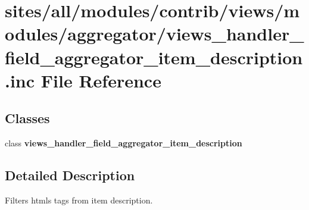 \hypertarget{views__handler__field__aggregator__item__description_8inc}{
\section{sites/all/modules/contrib/views/modules/aggregator/views\_\-handler\_\-field\_\-aggregator\_\-item\_\-description.inc File Reference}
\label{views__handler__field__aggregator__item__description_8inc}
}
\subsection*{Classes}
\begin{CompactItemize}
\item 
class \textbf{views\_\-handler\_\-field\_\-aggregator\_\-item\_\-description}
\end{CompactItemize}


\subsection{Detailed Description}
Filters htmls tags from item description. 